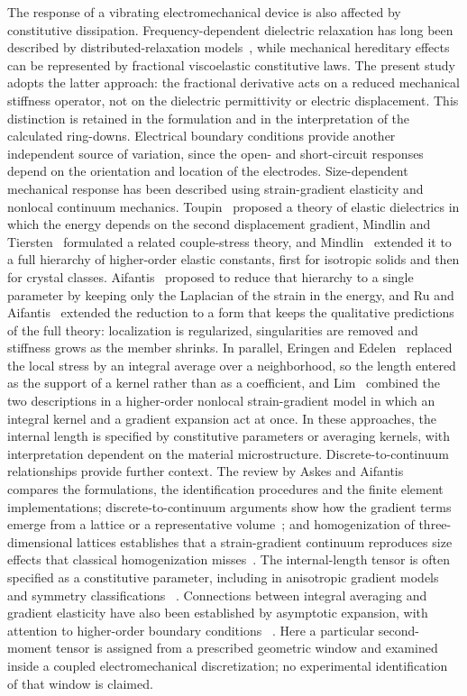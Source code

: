 The response of a vibrating electromechanical device is also affected by
constitutive dissipation. Frequency-dependent dielectric relaxation has long
been described by distributed-relaxation models~\cite{ColeCole1941,HavriliakNegami1967},
while mechanical hereditary effects can be represented by fractional
viscoelastic constitutive laws. The present study adopts the latter approach:
the fractional derivative acts on a reduced mechanical stiffness operator,
not on the dielectric permittivity or electric displacement. This distinction
is retained in the formulation and in the interpretation of the calculated
ring-downs. Electrical boundary conditions provide another independent source
of variation, since the open- and short-circuit responses depend on the
orientation and location of the electrodes.
Size-dependent mechanical response has been described using
strain-gradient elasticity and nonlocal continuum mechanics. Toupin~\cite{Toupin1962} proposed a theory of
elastic dielectrics in which the energy depends on the second displacement
gradient, Mindlin and Tiersten~\cite{MindlinTiersten1962} formulated a related couple-stress theory, and Mindlin~\cite{Mindlin1964,Mindlin1965} extended
it to a full hierarchy of higher-order elastic constants, first for isotropic
solids and then for crystal classes. Aifantis~\cite{Aifantis1992} proposed to
reduce that hierarchy to a single parameter by keeping only the Laplacian of the
strain in the energy, and Ru and Aifantis~\cite{RuAifantis1993} extended the
reduction to a form that keeps the qualitative predictions of the full theory:
localization is regularized, singularities are removed and stiffness grows as
the member shrinks. In parallel, Eringen and
Edelen~\cite{EringenEdelen1972} replaced the local
stress by an integral average over a neighborhood, so the length entered as the
support of a kernel rather than as a coefficient, and Lim~\cite{Lim2015}
combined the two descriptions in a higher-order nonlocal strain-gradient model
in which an integral kernel and a gradient expansion act at once. In these approaches, the internal length is specified by constitutive
parameters or averaging kernels, with interpretation dependent on the
material microstructure. Discrete-to-continuum relationships provide further context. The review
by Askes and Aifantis~\cite{AskesAifantis2011} compares the formulations, the identification
procedures and the finite element implementations; discrete-to-continuum
arguments show how the gradient terms emerge from a lattice or a representative
volume~\cite{MetrikineAskes2002}; and homogenization of
three-dimensional lattices establishes that a strain-gradient continuum
reproduces size effects that classical homogenization
misses~\cite{Molavitabrizi2023}. The internal-length tensor is often specified as a constitutive parameter,
including in anisotropic gradient models and symmetry classifications
~\cite{Polizzotto2018,Auffray2019}. Connections between integral
averaging and gradient elasticity have also been established by asymptotic
expansion, with attention to higher-order boundary conditions
~\cite{BorinoPolizzotto2014}. Here a particular second-moment tensor is
assigned from a prescribed geometric window and examined inside a coupled
electromechanical discretization; no experimental identification of that
window is claimed.


